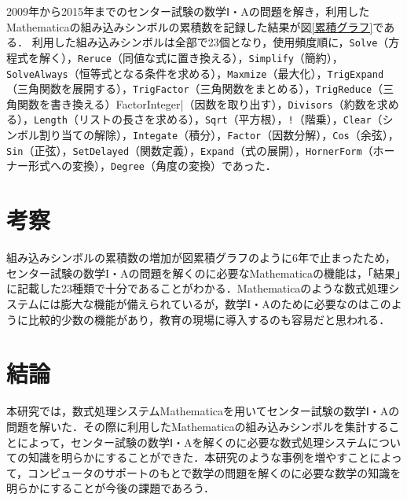 \documentclass[uplatex,twocolumn]{jsarticle}
\begin{document}
2009年から2015年までのセンター試験の数学Ⅰ・Aの問題を解き，利用したMathematicaの組み込みシンボルの累積数を記録した結果が図\ref{累積グラフ}である．
利用した組み込みシンボルは全部で23個となり，使用頻度順に，\verb|Solve|（方程式を解く），\verb|Reruce|（同値な式に置き換える），\verb|Simplify|（簡約），\verb|SolveAlways|（恒等式となる条件を求める），\verb|Maxmize|（最大化），\verb|TrigExpand|（三角関数を展開する），\verb|TrigFactor|（三角関数をまとめる），\verb|TrigReduce|（三角関数を書き換える）FactorInteger|（因数を取り出す），\verb|Divisors|（約数を求める），\verb|Length|（リストの長さを求める），\verb|Sqrt|（平方根），\verb|!|（階乗），\verb|Clear|（シンボル割り当ての解除），\verb|Integate|（積分），\verb|Factor|（因数分解），\verb|Cos|（余弦），\verb|Sin|（正弦），\verb|SetDelayed|（関数定義），\verb|Expand|（式の展開），\verb|HornerForm|（ホーナー形式への変換），\verb|Degree|（角度の変換）であった．

\section{考察}
組み込みシンボルの累積数の増加が図{累積グラフ}のように6年で止まったため，センター試験の数学I・Aの問題を解くのに必要なMathematicaの機能は，「結果」に記載した23種類で十分であることがわかる．Mathematicaのような数式処理システムには膨大な機能が備えられているが，数学I・Aのために必要なのはこのように比較的少数の機能があり，教育の現場に導入するのも容易だと思われる．

\section{結論}
本研究では，数式処理システムMathematicaを用いてセンター試験の数学Ⅰ・Aの問題を解いた．その際に利用したMathematicaの組み込みシンボルを集計することによって，センター試験の数学Ⅰ・Aを解くのに必要な数式処理システムについての知識を明らかにすることができた．本研究のような事例を増やすことによって，コンピュータのサポートのもとで数学の問題を解くのに必要な数学の知識を明らかにすることが今後の課題であろう．





\end{document}
